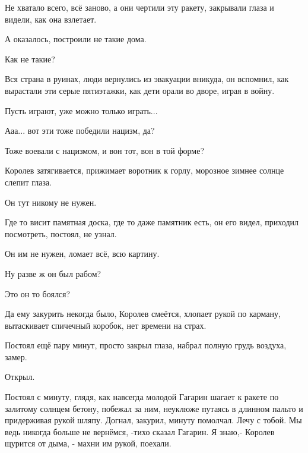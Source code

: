 Не хватало всего, всё заново, а они чертили эту ракету, закрывали глаза и видели, как она взлетает.

А оказалось, построили не такие дома.

Как не такие?

Вся страна в руинах, люди вернулись из эвакуации вникуда, он вспомнил, как
вырастали эти серые пятиэтажки, как дети орали во дворе, играя в войну.

Пусть играют, уже можно только играть...

Ааа... вот эти тоже победили нацизм, да?

Тоже воевали с нацизмом, и вон тот, вон в той форме?

Королев затягивается, прижимает воротник к горлу, морозное зимнее солнце слепит
глаза.

Он тут никому не нужен.

Где то висит памятная доска, где то даже памятник есть, он его видел, приходил
посмотреть, постоял, не узнал.

Он им не нужен, ломает всё, всю картину.

Ну разве ж он был рабом?

Это он то боялся?

Да ему закурить некогда было, Королев смеётся, хлопает рукой по карману,
вытаскивает спичечный коробок, нет времени на страх.

Постоял ещё пару минут, просто закрыл глаза, набрал полную грудь воздуха, замер.

Открыл.

Постоял с минуту, глядя, как навсегда молодой Гагарин шагает к ракете по залитому солнцем бетону, побежал за ним, неуклюже путаясь в длинном пальто и придерживая рукой шляпу.
Догнал, закурил, минуту помолчал.
Лечу с тобой.
Мы ведь никогда больше не вернёмся, -тихо сказал Гагарин.
Я знаю,- Королев щурится от дыма, - махни им рукой, поехали.
\restorecr
